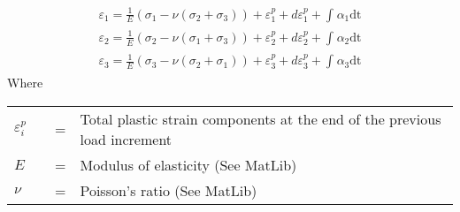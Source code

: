 \begin{equation}
    \begin{aligned}
       \varepsilon_{1} = \frac{1}{E}\left( \sigma_{1} - \nu\left( \sigma_{2} + \sigma_{3} \right) \right) + \varepsilon_{1}^{p} + d\varepsilon_{1}^{p} + \int_{}^{}{\alpha_{1}\text{dt}}  \\
       \varepsilon_{2} = \frac{1}{E}\left( \sigma_{2} - \nu\left( \sigma_{1} + \sigma_{3} \right) \right) + \varepsilon_{2}^{p} + d\varepsilon_{2}^{p} + \int_{}^{}{\alpha_{2}\text{dt}}  \\
       \varepsilon_{3} = \frac{1}{E}\left( \sigma_{3} - \nu\left( \sigma_{2} + \sigma_{1} \right) \right) + \varepsilon_{3}^{p} + d\varepsilon_{3}^{p} + \int_{}^{}{\alpha_{3}\text{dt}}
    \end{aligned}
\end{equation}
Where

\begin{table}[H]
    \begin{tabular}[c]{l l l l} \\                                                                                                                           
        \(\varepsilon_{i}^{p}\) &   \hspace{0.05in}     &   = &     Total plastic strain components at the end of the previous load increment    \\

        \(E\)                   &   \hspace{0.05in}     &   = &     Modulus of elasticity (See MatLib)                                           \\

        \(\nu\)                 &   \hspace{0.05in}     &   = &     Poisson's ratio (See MatLib)                                                 \\
    \end{tabular}
\end{table}

